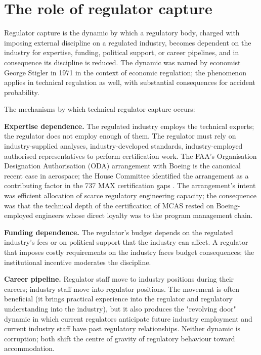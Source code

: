 \section{The role of regulator capture}

Regulator capture is the dynamic by which a regulatory body, charged with imposing external discipline on a regulated industry, becomes dependent on the industry for expertise, funding, political support, or career pipelines, and in consequence its discipline is reduced. The dynamic was named by economist George Stigler in 1971 in the context of economic regulation; the phenomenon applies in technical regulation as well, with substantial consequences for accident probability.

The mechanisms by which technical regulator capture occurs:

\textbf{Expertise dependence.} The regulated industry employs the technical experts; the regulator does not employ enough of them. The regulator must rely on industry-supplied analyses, industry-developed standards, industry-employed authorised representatives to perform certification work. The FAA's Organisation Designation Authorisation (ODA) arrangement with Boeing is the canonical recent case in aerospace; the House Committee identified the arrangement as a contributing factor in the 737 MAX certification gaps \cite{acc:house-737max-2020}. The arrangement's intent was efficient allocation of scarce regulatory engineering capacity; the consequence was that the technical depth of the certification of MCAS rested on Boeing-employed engineers whose direct loyalty was to the program management chain.

\textbf{Funding dependence.} The regulator's budget depends on the regulated industry's fees or on political support that the industry can affect. A regulator that imposes costly requirements on the industry faces budget consequences; the institutional incentive moderates the discipline.

\textbf{Career pipeline.} Regulator staff move to industry positions during their careers; industry staff move into regulator positions. The movement is often beneficial (it brings practical experience into the regulator and regulatory understanding into the industry), but it also produces the "revolving door" dynamic in which current regulators anticipate future industry employment and current industry staff have past regulatory relationships. Neither dynamic is corruption; both shift the centre of gravity of regulatory behaviour toward accommodation.

